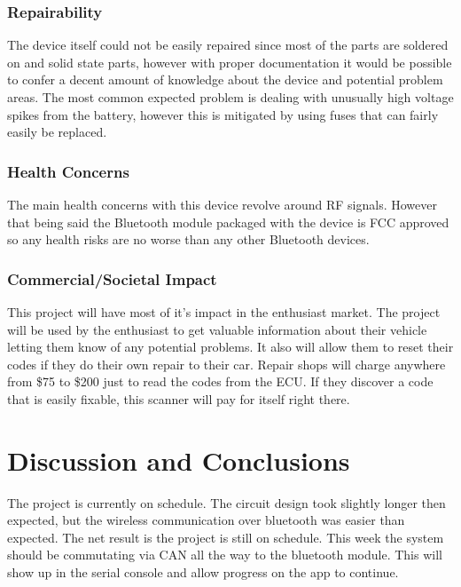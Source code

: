 \documentclass[12pt,letterpaper]{article}
\begin{document}
\subsubsection{Repairability}
The device itself could not be easily repaired since most of the parts are soldered on and solid state parts, however with proper documentation it would be possible to confer a decent amount of knowledge about the device and potential problem areas. The most common expected problem is dealing with unusually high voltage spikes from the battery, however this is mitigated by using fuses that can fairly easily be replaced.

\subsubsection{Health Concerns}
The main health concerns with this device revolve around RF signals. However that being said the Bluetooth module packaged with the device is FCC approved so any health risks are no worse than any other Bluetooth devices.

\subsubsection{Commercial/Societal Impact}
This project will have most of it's impact in the enthusiast market. The project will be used by the enthusiast to get valuable information about their vehicle letting them know of any potential problems. It also will allow them to reset their codes if they do their own repair to their car. Repair shops will charge anywhere from \$75 to \$200 just to read the codes from the ECU. If they discover a code that is easily fixable, this scanner will pay for itself right there.

\section{Discussion and Conclusions}
The project is currently on schedule. The circuit design took slightly longer then expected, but the wireless communication over bluetooth was easier than expected. The net result is the project is still on schedule. This week the system should be commutating via CAN all the way to the bluetooth module. This will show up in the serial console and allow progress on the app to continue. 
\end{document}
